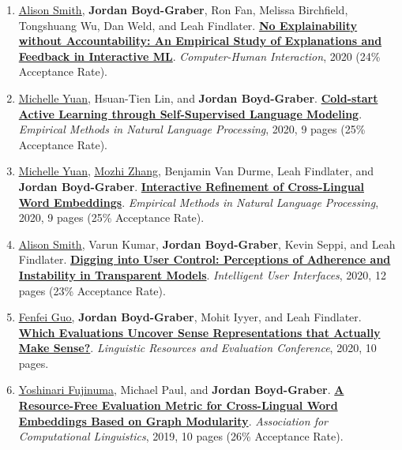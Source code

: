 {\begin{enumerate}
	 \item \underline{\href{http://alisonmsmith.github.io/}{Alison Smith}}, {\bf Jordan Boyd-Graber}, Ron Fan, Melissa Birchfield, Tongshuang Wu, Dan Weld, and Leah Findlater.  {\bf \href{http://cs.umd.edu/~jbg//docs/2020_chi_explanation.pdf}{No Explainability without Accountability: An Empirical Study of Explanations and Feedback in Interactive ML}}.  \emph{Computer-Human Interaction}, 2020 (24\% Acceptance Rate).

	 \item \underline{\href{https://forest-snow.github.io/}{Michelle Yuan}}, Hsuan-Tien Lin, and {\bf Jordan Boyd-Graber}.  {\bf \href{http://cs.umd.edu/~jbg//docs/2020_emnlp_alps.pdf}{Cold-start Active Learning through Self-Supervised Language Modeling}}.  \emph{Empirical Methods in Natural Language Processing}, 2020, 9 pages (25\% Acceptance Rate).

	 \item \underline{\href{https://forest-snow.github.io/}{Michelle Yuan}}, \underline{\href{http://www.mozhi.umiacs.io}{Mozhi Zhang}}, Benjamin {Van Durme}, Leah Findlater, and {\bf Jordan Boyd-Graber}.  {\bf \href{http://cs.umd.edu/~jbg//docs/2020_emnlp_clime.pdf}{Interactive Refinement of Cross-Lingual Word Embeddings}}.  \emph{Empirical Methods in Natural Language Processing}, 2020, 9 pages (25\% Acceptance Rate).

	 \item \underline{\href{http://alisonmsmith.github.io/}{Alison Smith}}, Varun Kumar, {\bf Jordan Boyd-Graber}, Kevin Seppi, and Leah Findlater.  {\bf \href{http://cs.umd.edu/~jbg//docs/2020_iui_control.pdf}{Digging into User Control: Perceptions of Adherence and
Instability in Transparent Models}}.  \emph{Intelligent User Interfaces}, 2020, 12 pages (23\% Acceptance Rate).

	 \item \underline{\href{https://www.linkedin.com/in/fenfei-guo-74924031}{Fenfei Guo}}, {\bf Jordan Boyd-Graber}, Mohit Iyyer, and Leah Findlater.  {\bf \href{http://cs.umd.edu/~jbg//docs/2020_lrec_sense.pdf}{Which Evaluations Uncover Sense Representations that Actually Make Sense?}}.  \emph{Linguistic Resources and Evaluation Conference}, 2020, 10 pages.

	 \item \underline{\href{http://akkikiki.github.io/about/}{Yoshinari Fujinuma}}, Michael Paul, and {\bf Jordan Boyd-Graber}.  {\bf \href{http://cs.umd.edu/~jbg//docs/2019_acl_modularity.pdf}{A Resource-Free Evaluation Metric for Cross-Lingual Word Embeddings Based on Graph Modularity}}.  \emph{Association for Computational Linguistics}, 2019, 10 pages (26\% Acceptance Rate).


\end{enumerate}}
